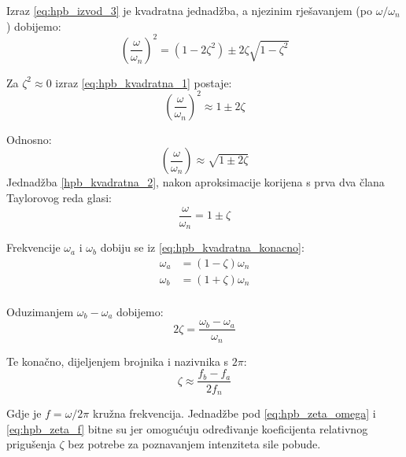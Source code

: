 Izraz \eqref{eq:hpb_izvod_3} je kvadratna jednadžba, a njezinim rješavanjem (po
$\omega/\omega_n$) dobijemo:
\begin{equation}\label{eq:hpb_kvadratna_1}
    \left(\frac{\omega}{\omega_n}\right)^2 = 
        (1-2\zeta^2)\pm 2\zeta\sqrt{1-\zeta^2}
\end{equation}

Za $\zeta^2 \approx 0$ izraz \eqref{eq:hpb_kvadratna_1} postaje:
\begin{equation}
    \left(\frac{\omega}{\omega_n}\right)^2 \approx
        1 \pm 2\zeta
\end{equation}

Odnosno:
\begin{equation}\label{eq:hpb_kvadratna_2}
    \left(\frac{\omega}{\omega_n}\right)\approx
        \sqrt{1 \pm 2\zeta}
\end{equation}
Jednadžba \eqref{hpb_kvadratna_2}, nakon aproksimacije korijena s prva dva člana Taylorovog
reda glasi:
\begin{equation}\label{eq:hpb_kvadratna_konacno}
    \frac{\omega}{\omega_n} = 1 \pm \zeta
\end{equation}

Frekvencije $\omega_a$ i $\omega_b$ dobiju se iz \eqref{eq:hpb_kvadratna_konacno}:
\begin{align}
    \omega_a &= (1-\zeta)\omega_n\\
    \omega_b &= (1+\zeta)\omega_n\\
\end{align}

Oduzimanjem $\omega_b-\omega_a$ dobijemo:
\begin{equation}\label{eq:hpb_zeta_omega}
        2\zeta = \frac{\omega_b-\omega_a}{\omega_n}
\end{equation}

Te konačno, dijeljenjem brojnika i nazivnika s $2\pi$:
\begin{equation}\label{eq:hpb_zeta_f}
    \zeta\approx\frac{f_b-f_a}{2f_n}
\end{equation}

Gdje je $f=\omega/2\pi$ kružna frekvencija. Jednadžbe pod \eqref{eq:hpb_zeta_omega}
i \eqref{eq:hpb_zeta_f} bitne su jer omogućuju određivanje koeficijenta relativnog prigušenja
$\zeta$ bez potrebe za poznavanjem intenziteta sile pobude. 


